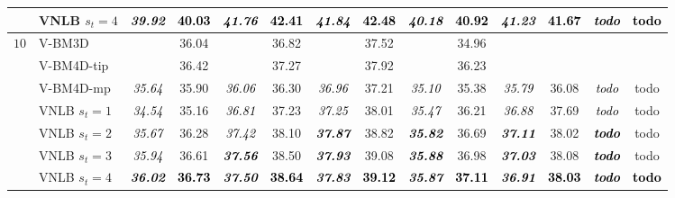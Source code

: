 \documentclass[10pt, journal, twocolumn, final, a4paper]{IEEEtran}
\newcommand{\best}[1]{#1}
\newcommand{\bsic}[1]{\textcolor{black}{\textit{#1}}}
\newcommand{\Bsic}[1]{\textcolor{black}{\textbf{\textit{#1}}}}
\newcommand{\Best}[1]{\textbf{\textcolor{black}{#1}}}
\begin{document}
\begin{table}[htp!]
\begin{center}
{\begin{tabular}{ c | l |c c | c c | c c | c c | c c | c c}
			                      & VNLB   $s_t = 4$     & \Bsic{39.92} & \Best{40.03} & \Bsic{41.76} & \Best{42.41} & \Bsic{41.84} & \Best{42.48} & \Bsic{40.18} & \Best{40.92} & \Bsic{41.23} & \Best{41.67} & \Bsic{todo } & \Best{todo } \\\hline
%                                                                                                                                                                                                                                         
			\multirow{1}{*}{$10$}
			                      & V-BM3D               & \bsic{     } &       36.04  & \bsic{     } &       36.82  & \bsic{     } &       37.52  & \bsic{     } &       34.96  & \bsic{     } &              & \bsic{     } &              \\
			                      & V-BM4D-tip           & \bsic{     } & \best{36.42} & \bsic{     } & \best{37.27} & \bsic{     } &       37.92  & \bsic{     } &       36.23  & \bsic{     } &              & \bsic{     } &              \\
			                      & V-BM4D-mp            & \bsic{35.64} &       35.90  & \bsic{36.06} &       36.30  & \bsic{36.96} &       37.21  & \bsic{35.10} &       35.38  & \bsic{35.79} &       36.08  & \bsic{todo } &       todo   \\
			                      & VNLB   $s_t = 1$     & \bsic{34.54} &       35.16  & \bsic{36.81} &       37.23  & \bsic{37.25} &       38.01  & \bsic{35.47} &       36.21  & \bsic{36.88} &       37.69  & \bsic{todo } &       todo   \\
			                      & VNLB   $s_t = 2$     & \bsic{35.67} &       36.28  & \bsic{37.42} &       38.10  & \Bsic{37.87} &       38.82  & \Bsic{35.82} &       36.69  & \Bsic{37.11} &       38.02  & \Bsic{todo } &       todo   \\
			                      & VNLB   $s_t = 3$     & \bsic{35.94} &       36.61  & \Bsic{37.56} &       38.50  & \Bsic{37.93} &       39.08  & \Bsic{35.88} &       36.98  & \Bsic{37.03} &       38.08  & \Bsic{todo } &       todo   \\
			                      & VNLB   $s_t = 4$     & \Bsic{36.02} & \Best{36.73} & \Bsic{37.50} & \Best{38.64} & \Bsic{37.83} & \Best{39.12} & \Bsic{35.87} & \Best{37.11} & \Bsic{36.91} & \Best{38.03} & \Bsic{todo } & \Best{todo } \\\hline

\end{tabular}}
\end{center}
\end{table}
\end{document}
